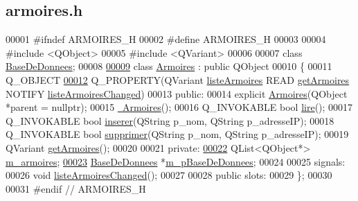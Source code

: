\hypertarget{armoires_8h_source}{}\subsection{armoires.\+h}
\label{armoires_8h_source}

\begin{DoxyCode}
00001 \textcolor{preprocessor}{#ifndef ARMOIRES\_H}
00002 \textcolor{preprocessor}{#define ARMOIRES\_H}
00003 
00004 \textcolor{preprocessor}{#include <QObject>}
00005 \textcolor{preprocessor}{#include <QVariant>}
00006 
00007 \textcolor{keyword}{class }\hyperlink{class_base_de_donnees}{BaseDeDonnees};
00008 
\hyperlink{class_armoires}{00009} \textcolor{keyword}{class }\hyperlink{class_armoires}{Armoires} : \textcolor{keyword}{public} QObject
00010 \{
00011     Q\_OBJECT
\hyperlink{class_armoires_aa17b53e9003fe2285d7e9e0ad6999137}{00012}     Q\_PROPERTY(QVariant \hyperlink{class_armoires_aa17b53e9003fe2285d7e9e0ad6999137}{listeArmoires} READ \hyperlink{class_armoires_a4ad204a0768f9aa9cfb400a362ae7b07}{getArmoires} NOTIFY 
      \hyperlink{class_armoires_a5d1b239d24b608ce8f41677d0fbe3507}{listeArmoiresChanged})
00013 \textcolor{keyword}{public}:
00014     \textcolor{keyword}{explicit} \hyperlink{class_armoires_a0783981e55af5badbcb4b8eb5a52a0eb}{Armoires}(QObject *parent = \textcolor{keyword}{nullptr});
00015     \hyperlink{class_armoires_ae486320e819485eb011bb952aced3de2}{~Armoires}();
00016     Q\_INVOKABLE \textcolor{keywordtype}{bool} \hyperlink{class_armoires_a2b64b3df08cf848d06b4ffb6a49ae858}{lire}();
00017     Q\_INVOKABLE \textcolor{keywordtype}{bool} \hyperlink{class_armoires_a0aa944d8f94667783ea95424e1915aba}{inserer}(QString p\_nom, QString p\_adresseIP);
00018     Q\_INVOKABLE \textcolor{keywordtype}{bool} \hyperlink{class_armoires_aa8cb545cec5ebf4603dff93e87662cc9}{supprimer}(QString p\_nom, QString p\_adresseIP);
00019     QVariant \hyperlink{class_armoires_a4ad204a0768f9aa9cfb400a362ae7b07}{getArmoires}();
00020 
00021 \textcolor{keyword}{private}:
\hyperlink{class_armoires_a13bc03c96ba9e069bc377f6ea10472ba}{00022}     QList<QObject*> \hyperlink{class_armoires_a13bc03c96ba9e069bc377f6ea10472ba}{m\_armoires};
\hyperlink{class_armoires_a096a57892eaad473fefc2a20fe4965bd}{00023}     \hyperlink{class_base_de_donnees}{BaseDeDonnees} *\hyperlink{class_armoires_a096a57892eaad473fefc2a20fe4965bd}{m\_pBaseDeDonnees};
00024 
00025 signals:
00026     \textcolor{keywordtype}{void} \hyperlink{class_armoires_a5d1b239d24b608ce8f41677d0fbe3507}{listeArmoiresChanged}();
00027 
00028 \textcolor{keyword}{public} slots:
00029 \};
00030 
00031 \textcolor{preprocessor}{#endif // ARMOIRES\_H}
\end{DoxyCode}
